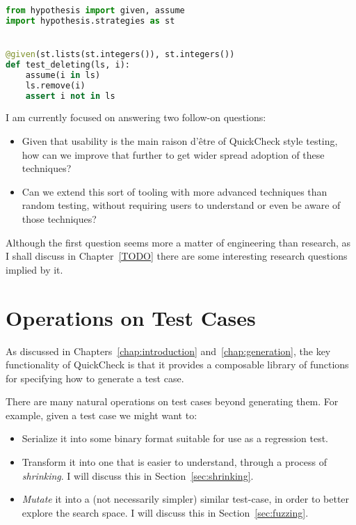 \begin{lstlisting}[language=Python]
from hypothesis import given, assume
import hypothesis.strategies as st


@given(st.lists(st.integers()), st.integers())
def test_deleting(ls, i):
    assume(i in ls)
    ls.remove(i)
    assert i not in ls
\end{lstlisting}

I am currently focused on answering two follow-on questions:

\begin{itemize}
\item Given that usability is the main raison d'être of QuickCheck style testing,
how can we improve that further to get wider spread adoption of these techniques?
\item Can we extend this sort of tooling with more advanced techniques than random testing,
without requiring users to understand or even be aware of those techniques?
\end{itemize}

Although the first question seems more a matter of engineering than research,
as I shall discuss in Chapter~\ref{TODO} there are some interesting research questions implied by it.

\chapter{Operations on Test Cases}

As discussed in Chapters~\ref{chap:introduction} and~\ref{chap:generation},
the key functionality of QuickCheck is that it provides a composable library of functions for specifying how to generate a test case.

There are many natural operations on test cases beyond generating them.
For example,
given a test case we might want to:

\begin{itemize}
\item Serialize it into some binary format suitable for use as a regression test.
\item Transform it into one that is easier to understand,
through a process of \emph{shrinking}.
I will discuss this in Section~\ref{sec:shrinking}.
\item \emph{Mutate} it into a (not necessarily simpler) similar test-case,
in order to better explore the search space. I will discuss this in Section~\ref{sec:fuzzing}.
\end{itemize}

